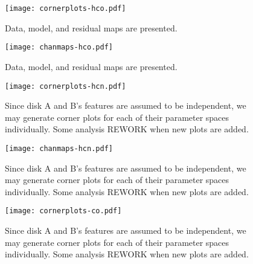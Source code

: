 \begin{figure}[htp]
  \hspace*{\fill}%
  \texttt{[image: cornerplots-hco.pdf]}\hfill%
  \hspace*{\fill}%
  \caption{Data, model, and residual maps are presented.}
  \label{fig:hco_cornerplots}
\end{figure}



\begin{figure}[htp]
  \hspace*{\fill}%
  \texttt{[image: chanmaps-hco.pdf]}\hfill%
  \hspace*{\fill}%
  \caption{Data, model, and residual maps are presented.}
  \label{fig:hco_chanmaps}
\end{figure}


\begin{figure}[htp]
  \hspace*{\fill}%
  \texttt{[image: cornerplots-hcn.pdf]}\hfill%
  \hspace*{\fill}%
  \caption{Since disk A and B's features are assumed to be independent, we may generate corner plots for each of their parameter spaces individually. Some analysis REWORK when new plots are added.}
  \label{fig:hcn_cornerplots}
\end{figure}



\begin{figure}[htp]
  \hspace*{\fill}%
  \texttt{[image: chanmaps-hcn.pdf]}\hfill%
  \hspace*{\fill}%
  \caption{Since disk A and B's features are assumed to be independent, we may generate corner plots for each of their parameter spaces individually. Some analysis REWORK when new plots are added.}
  \label{fig:hcn_chanmaps}
\end{figure}




\begin{figure}[htp]
  \hspace*{\fill}%
  \texttt{[image: cornerplots-co.pdf]}\hfill%
  \hspace*{\fill}%
  \caption{Since disk A and B's features are assumed to be independent, we may generate corner plots for each of their parameter spaces individually. Some analysis REWORK when new plots are added.}
  \label{fig:co_cornerplots}
\end{figure}


